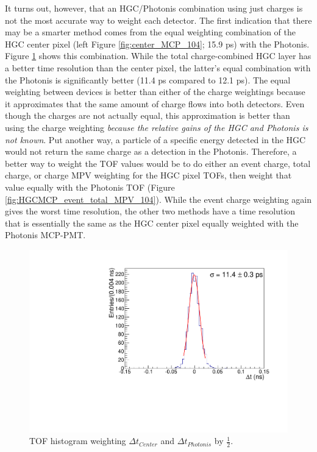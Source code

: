 \documentclass[twocolumn,aps,prd,reprint,superscriptaddress,floatfix]{revtex4-1}
\begin{document}
It turns out, however, that an HGC/Photonis combination using just charges is not the most accurate way to weight each detector. 
The first indication that there may be a smarter method comes from the equal weighting combination of the HGC center pixel (left Figure \ref{fig:center_MCP_104}; 15.9 ps) with the Photonis. 
Figure \ref{fig:CenterMCPEqual104} shows this combination. 
While the total charge-combined HGC layer has a better time resolution than the center pixel, the latter's equal combination with the Photonis is significantly better (11.4 ps compared to 12.1 ps). 
The equal weighting between devices is better than either of the charge weightings because it approximates that the same amount of charge flows into both detectors.
Even though the charges are not actually equal, this approximation is better than using the charge weighting \textit{because the relative gains of the HGC and Photonis is not known}. 
Put another way, a particle of a specific energy detected in the HGC would not return the same charge as a detection in the Photonis. 
Therefore, a better way to weight the TOF values would be to do either an event charge, total charge, or charge MPV weighting for the HGC pixel TOFs, then weight that value equally with the Photonis TOF (Figure \ref{fig:HGCMCP_event_total_MPV_104}). 
While the event charge weighting again gives the worst time resolution, the other two methods have a time resolution that is essentially the same as the HGC center pixel equally weighted with the Photonis MCP-PMT. 

\begin{figure}[!htbp]
	\centering
	\includegraphics[width=\linewidth]{deltaT_Center_MCP_Equal104.pdf}
	\caption{TOF histogram weighting $\Delta t_{Center}$ and $\Delta t_{Photonis}$ by $\frac{1}{2}$.}
	\label{fig:CenterMCPEqual104}
\end{figure}
\end{document}

